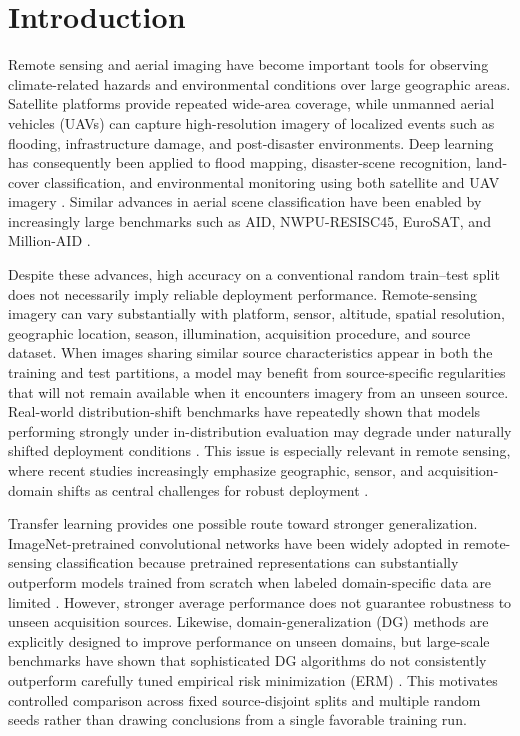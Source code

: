 \section{Introduction}
\label{sec:introduction}

Remote sensing and aerial imaging have become important tools for observing climate-related hazards and environmental conditions over large geographic areas. Satellite platforms provide repeated wide-area coverage, while unmanned aerial vehicles (UAVs) can capture high-resolution imagery of localized events such as flooding, infrastructure damage, and post-disaster environments. Deep learning has consequently been applied to flood mapping, disaster-scene recognition, land-cover classification, and environmental monitoring using both satellite and UAV imagery \cite{bonafilia2020sen1floods11,rahnemoonfar2021floodnet,kyrkou2020emergencynet,vanexel2025climate}. Similar advances in aerial scene classification have been enabled by increasingly large benchmarks such as AID, NWPU-RESISC45, EuroSAT, and Million-AID \cite{xia2017aid,cheng2017resisc45,helber2019eurosat,long2021millionaid}.

Despite these advances, high accuracy on a conventional random train--test split does not necessarily imply reliable deployment performance. Remote-sensing imagery can vary substantially with platform, sensor, altitude, spatial resolution, geographic location, season, illumination, acquisition procedure, and source dataset. When images sharing similar source characteristics appear in both the training and test partitions, a model may benefit from source-specific regularities that will not remain available when it encounters imagery from an unseen source. Real-world distribution-shift benchmarks have repeatedly shown that models performing strongly under in-distribution evaluation may degrade under naturally shifted deployment conditions \cite{koh2021wilds,gulrajani2021domainbed}. This issue is especially relevant in remote sensing, where recent studies increasingly emphasize geographic, sensor, and acquisition-domain shifts as central challenges for robust deployment \cite{peng2022dasurvey,zhou2023dgsurvey,alemadi2025rwds,liao2026dgsurvey}.

Transfer learning provides one possible route toward stronger generalization. ImageNet-pretrained convolutional networks have been widely adopted in remote-sensing classification because pretrained representations can substantially outperform models trained from scratch when labeled domain-specific data are limited \cite{hu2015transfercnn,nogueira2017convnets,ma2024transfer}. However, stronger average performance does not guarantee robustness to unseen acquisition sources. Likewise, domain-generalization (DG) methods are explicitly designed to improve performance on unseen domains, but large-scale benchmarks have shown that sophisticated DG algorithms do not consistently outperform carefully tuned empirical risk minimization (ERM) \cite{gulrajani2021domainbed}. This motivates controlled comparison across fixed source-disjoint splits and multiple random seeds rather than drawing conclusions from a single favorable training run.

